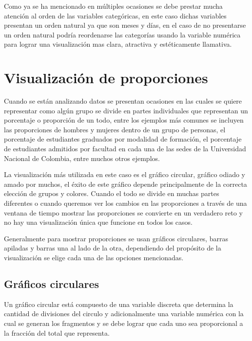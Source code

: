 \documentclass[
]{book}
\begin{document}
Como ya se ha mencionado en múltiples ocasiones se debe prestar mucha atención al orden de las variables categóricas, en este caso dichas variables presentan un orden natural ya que son meses y días, en el caso de no presentarse un orden natural podría reordenarse las categorías usando la variable numérica para lograr una visualización mas clara, atractiva y estéticamente llamativa.

\hypertarget{visualizaciuxf3n-de-proporciones}{%
\section{Visualización de proporciones}\label{visualizaciuxf3n-de-proporciones}}

Cuando se están analizando datos se presentan ocasiones en las cuales se quiere representar como algún grupo se divide en partes individuales que representan un porcentaje o proporción de un todo, entre los ejemplos más comunes se incluyen las proporciones de hombres y mujeres dentro de un grupo de personas, el porcentaje de estudiantes graduados por modalidad de formación, el porcentaje de estudiantes admitidos por facultad en cada una de las sedes de la Universidad Nacional de Colombia, entre muchos otros ejemplos.

La visualización más utilizada en este caso es el gráfico circular, gráfico odiado y amado por muchos, el éxito de este gráfico depende principalmente de la correcta elección de grupos y colores. Cuando el todo se divide en muchas partes diferentes o cuando queremos ver los cambios en las proporciones a través de una ventana de tiempo mostrar las proporciones se convierte en un verdadero reto y no hay una visualización única que funcione en todos los casos.

Generalmente para mostrar proporciones se usan gráficos circulares, barras apiladas y barras una al lado de la otra, dependiendo del propósito de la visualización se elige cada una de las opciones mencionadas.

\hypertarget{gruxe1ficos-circulares}{%
\subsection{Gráficos circulares}\label{gruxe1ficos-circulares}}

Un gráfico circular está compuesto de una variable discreta que determina la cantidad de divisiones del circulo y adicionalmente una variable numérica con la cual se generan los fragmentos y se debe lograr que cada uno sea proporcional a la fracción del total que representa.
\end{document}
